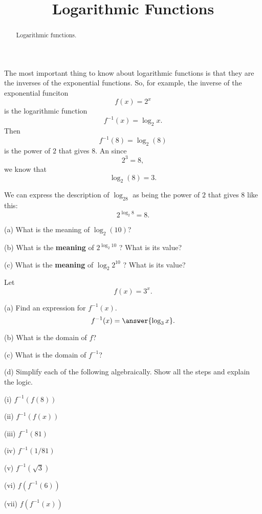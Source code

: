 \documentclass{ximera}
\title{Logarithmic Functions}
\begin{document}
\begin{abstract}
Logarithmic functions.
\end{abstract}
\maketitle


The most important thing to know about logarithmic functions is that they are the inverses of the exponential functions. So, for example, the inverse of the exponential funciton
\[
    f(x) = 2^x
\]
is the logarithmic function 
\[
   f^{-1}(x) = \log_2 x.
\]
Then 
\[
    f^{-1}(8) = \log_2 (8)    
\]
is the power of $2$ that gives $8$. An since
\[
   2^3 = 8 ,
\]
we know that
\[
   \log_2(8) = 3 .
\]

We can express the description of $\log_28$ as being the power of $2$ that gives $8$ like this:
\[
   2^{\log_2 8} = 8.
\]

\begin{question}    \label{Ex0:LogF}
(a) What is the meaning of $\log_2(10)$?

(b) What is the {\bf meaning} of $2^{\log_2 10}$ ? What is its value?

(c) What is the {\bf meaning} of $\log_2 2^{10}$ ? What is its value?

\end{question}


\begin{question}  \label{Q1:LogF}
Let 
\[
    f(x) = 3^x .
\]

(a) Find an expression for $f^{-1}(x)$.
\[
   f^{-1}(x) = \answer{\log_3 x}.
\]

(b) What is the domain of $f$?

(c) What is the domain of $f^{-1}$?

(d) Simplify each of the following algebraically. Show all the steps and explain the logic.

(i) $f^{-1}(f(8))$

(ii)  $f^{-1}(f(x))$

(iii) $f^{-1}(81)$

(iv) $f^{-1}(1/81)$

(v) $f^{-1} (\sqrt{3})$

(vi) $f(f^{-1}(6))$

(vii) $f(f^{-1}(x))$


\end{question}
\end{document}
